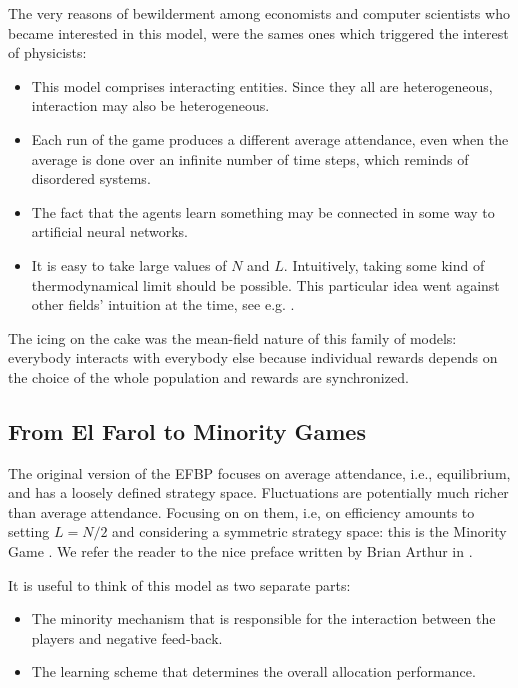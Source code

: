 \documentclass[aps,twocolumn,nofootinbib,sortedaddress,reprint]{revtex4-1}
\begin{document}
The very reasons of bewilderment among economists and computer
scientists who became interested in this model, were the sames ones which
triggered the interest of physicists:
\begin{itemize}
\item This model comprises interacting entities. Since they all are
  heterogeneous, interaction may also be heterogeneous.
\item Each run of the game produces a different average attendance,
  even when the average is done over an infinite number of time steps, which reminds of
  disordered systems.
\item The fact that the agents learn something may be connected in
  some way to artificial neural networks.
\item It is easy to take large values of $N$ and $L$. Intuitively,
  taking some kind of thermodynamical limit should be
  possible. This particular idea went against other fields'
    intuition at the time, see e.g. \textcite{Casti}.
\end{itemize}
The icing on the cake was the mean-field nature of this family of
models: everybody interacts with everybody else because individual
rewards depends on the choice of the whole population and rewards are
synchronized.



\subsection{From El Farol to Minority Games}

The original version of the EFBP focuses on average attendance, i.e.,
equilibrium, and has a loosely defined strategy space. Fluctuations are potentially much richer than average attendance.
  Focusing on
on them, i.e, on efficiency amounts to setting $L=N/2$ and
considering a symmetric strategy space: this is the Minority Game \cite{CZ97}. We refer the reader to the nice
  preface written by Brian Arthur in \textcite{MGbook}.

   It is useful to think of this model as two separate parts:
\begin{itemize}
\item The minority mechanism that is responsible for the interaction
  between the players and negative feed-back.
\item The learning scheme that determines the overall allocation
  performance.
\end{itemize}
\end{document}
